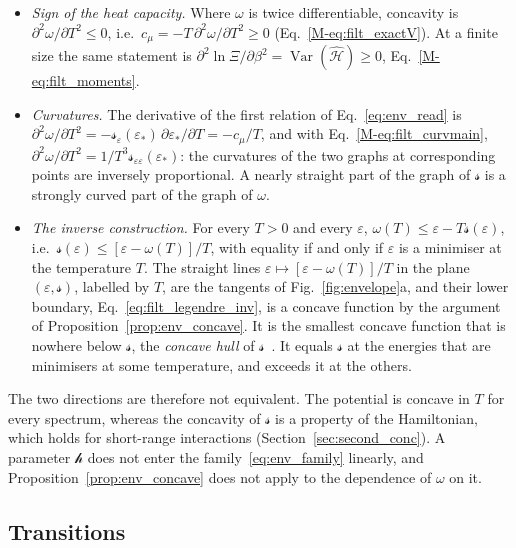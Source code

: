 \documentclass[10pt,a4paper]{article}
\theoremstyle{plain}
\theoremstyle{remark}
\newcommand{\Var}{\operatorname{Var}}
\newcommand{\hfield}{\mathscr{h}}  %
\newcommand{\lds}{\mathscr{s}}  %
\begin{document}
\begin{itemize}\setlength{\itemsep}{2pt}
\item \emph{Sign of the heat capacity.} Where $\omega$ is twice
  differentiable, concavity is $\partial^{2}\omega/\partial T^{2}\le0$, i.e.\
  $c_\mu=-T\,\partial^{2}\omega/\partial T^{2}\ge0$
  (Eq.~\eqref{M-eq:filt_exactV}). At a finite size the same statement is
  $\partial^{2}\ln\Xi/\partial\beta^{2}=\Var(\hat{\mathcal H})\ge0$,
  Eq.~\eqref{M-eq:filt_moments}.
\item \emph{Curvatures.} The derivative of the first relation of
  Eq.~\eqref{eq:env_read} is
  $\partial^{2}\omega/\partial T^{2}=-\lds_\varepsilon(\varepsilon_*)\,\partial\varepsilon_*/\partial T=-c_\mu/T$,
  and with Eq.~\eqref{M-eq:filt_curvmain},
  $\partial^{2}\omega/\partial T^{2}=1/T^{3}\lds_{\varepsilon\varepsilon}(\varepsilon_*)$:
  the curvatures of the two graphs at corresponding points are inversely
  proportional. A nearly straight part of the graph of $\lds$ is a
  strongly curved part of the graph of $\omega$.
\item \emph{The inverse construction.} For every $T>0$ and every
  $\varepsilon$, $\omega(T)\le\varepsilon-T\lds(\varepsilon)$, i.e.\
  $\lds(\varepsilon)\le[\varepsilon-\omega(T)]/T$, with equality if and only
  if $\varepsilon$ is a minimiser at the temperature $T$. The straight
  lines $\varepsilon\mapsto[\varepsilon-\omega(T)]/T$ in the plane
  $(\varepsilon,\lds)$, labelled by $T$, are the tangents of
  Fig.~\ref{fig:envelope}a, and their lower boundary,
  Eq.~\eqref{eq:filt_legendre_inv}, is a concave function by the argument
  of Proposition~\ref{prop:env_concave}. It is the smallest concave
  function that is nowhere below $\lds$, the \emph{concave hull} of
  $\lds$~\cite{Rockafellar}. It equals $\lds$ at the energies that are
  minimisers at some temperature, and exceeds it at the others.
\end{itemize}
The two directions are therefore not equivalent. The potential is concave
in $T$ for every spectrum, whereas the concavity of $\lds$ is a property of
the Hamiltonian, which holds for short-range interactions
(Section~\ref{sec:second_conc}). A parameter $\hfield$ does not enter the
family~\eqref{eq:env_family} linearly, and
Proposition~\ref{prop:env_concave} does not apply to the dependence of
$\omega$ on it.

\subsection{Transitions}
\label{sec:env_nonconcave}
\end{document}
